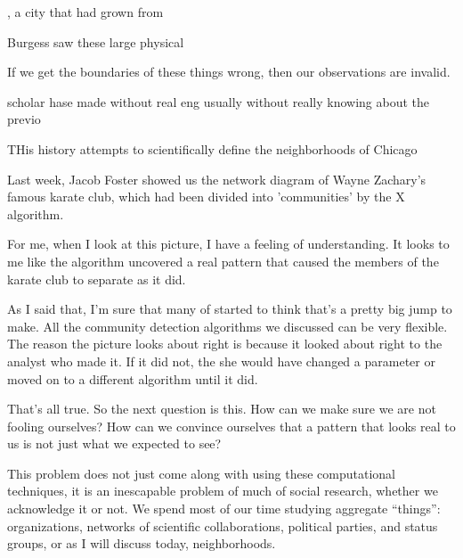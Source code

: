 , a city that had grown from 

Burgess saw these large physical  

If we get the boundaries of these things wrong, then our
  observations are invalid.





 scholar  hase made without real eng usually without really knowing about the previo

THis history attempts to scientifically
define the neighborhoods of Chicago

















Last week, Jacob Foster showed us the network diagram of Wayne
Zachary's famous karate club, which had been divided into
'communities' by the X algorithm. 





\testframe{}



For me, when I look at this picture, I have a feeling of
understanding. It looks to me like the algorithm uncovered a real
pattern that caused the members of the karate club to separate as it
did. 

As I said that, I'm sure that many of started to think that's a pretty
big jump to make. All the community detection algorithms we discussed
can be very flexible. The reason the picture looks about right is
because it looked about right to the analyst who made it. If it did
not, the she would have changed a parameter or moved on to a different
algorithm until it did.

That's all true. So the next question is this. How can we make sure we
are not fooling ourselves? How can we convince ourselves that a
pattern that looks real to us is not just what we expected to see?




This problem does not just come along with using these computational
techniques, it is an inescapable problem of much of social research,
whether we acknowledge it or not. We spend most of our time studying
aggregate ``things'': organizations, networks of scientific
collaborations, political parties, and status groups, or as I will
discuss today, neighborhoods.

